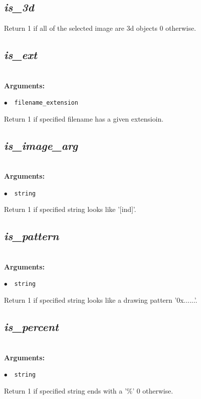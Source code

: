 \documentclass[a4paper,10.5pt,twoside]{book}
\def\comma{\discretionary{,}{}{,}}
\newcommand{\Cb}[1]{\textcolor{cb}{#1}}
\begin{document}
\subsection{\emph{is\_3d} }\vspace*{-0.7em}
Return 1 if all of the selected image are 3d objects{\comma} 0 otherwise.


\subsection{\emph{is\_ext} }\vspace*{-0.7em}
~\\\textbf{\Cb{Arguments: }}\begin{flushleft}
{\small \Cb{\hspace*{0.5cm}$\bullet$~~\texttt{filename{\comma}\_extension}}}\end{flushleft}
Return 1 if specified filename has a given extensioin.


\subsection{\emph{is\_image\_arg} }\vspace*{-0.7em}
~\\\textbf{\Cb{Arguments: }}\begin{flushleft}
{\small \Cb{\hspace*{0.5cm}$\bullet$~~\texttt{string}}}\end{flushleft}
Return 1 if specified string looks like '[ind]'.


\subsection{\emph{is\_pattern} }\vspace*{-0.7em}
~\\\textbf{\Cb{Arguments: }}\begin{flushleft}
{\small \Cb{\hspace*{0.5cm}$\bullet$~~\texttt{string}}}\end{flushleft}
Return 1 if specified string looks like a drawing pattern '0x......'.


\subsection{\emph{is\_percent} }\vspace*{-0.7em}
~\\\textbf{\Cb{Arguments: }}\begin{flushleft}
{\small \Cb{\hspace*{0.5cm}$\bullet$~~\texttt{string}}}\end{flushleft}
Return 1 if specified string ends with a '\%'{\comma} 0 otherwise.
\end{document}
